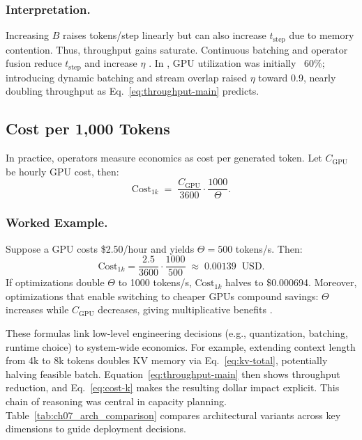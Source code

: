 \subsubsection{Interpretation.}  
Increasing $B$ raises tokens/step linearly but can also increase $t_{\text{step}}$ due to memory contention. Thus, throughput gains saturate. Continuous batching and operator fusion reduce $t_{\text{step}}$ and increase $\eta$ \cite{Kwon2023vLLM,Dao2022FlashAttention}. In \ishtar{}, GPU utilization was initially ~60\%; introducing dynamic batching and stream overlap raised $\eta$ toward 0.9, nearly doubling throughput as Eq.~\eqref{eq:throughput-main} predicts.

\subsection{Cost per 1{,}000 Tokens}
\label{sec:perf-cost-per-token}
In practice, operators measure economics as cost per generated token. Let $C_{\text{GPU}}$ be hourly GPU cost, then:
\begin{equation}
\text{Cost}_{1k} \;=\; \frac{C_{\text{GPU}}}{3600} \cdot \frac{1000}{\Theta}.
\label{eq:cost-k}
\end{equation}

\subsubsection{Worked Example.}  
Suppose a GPU costs \$2.50/hour and yields $\Theta=500$ tokens/s. Then:
\[
\text{Cost}_{1k} = \frac{2.5}{3600} \cdot \frac{1000}{500} \;\approx\; 0.00139 \;\;\text{USD}.
\]
If optimizations double $\Theta$ to 1000 tokens/s, $\text{Cost}_{1k}$ halves to \$0.000694. Moreover, optimizations that enable switching to cheaper GPUs compound savings: $\Theta$ increases while $C_{\text{GPU}}$ decreases, giving multiplicative benefits \cite{cloud-economics}.

These formulas link low-level engineering decisions (e.g., quantization, batching, runtime choice) to system-wide economics. For example, extending context length from 4k to 8k tokens doubles KV memory via Eq.~\eqref{eq:kv-total}, potentially halving feasible batch. Equation~\eqref{eq:throughput-main} then shows throughput reduction, and Eq.~\eqref{eq:cost-k} makes the resulting dollar impact explicit. This chain of reasoning was central in \ishtar{} capacity planning. Table~\ref{tab:ch07_arch_comparison} compares architectural variants across key dimensions to guide deployment decisions.

